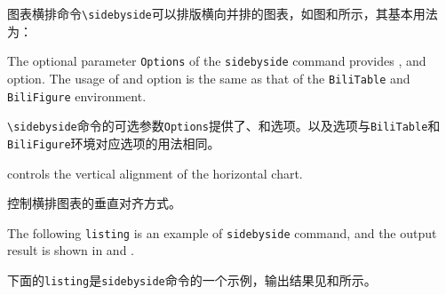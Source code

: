 \begin{ParaColumn}
    \switchcolumn

    图表横排命令\verb"\sidebyside"可以排版横向并排的图表，如图和所示，其基本用法为：

    \CrossColumnText{
        
        
    }
    \switchcolumn*

    The optional parameter \verb"Options" of the \verb"sidebyside" command provides ,  and  option.  The usage of  and  option is the same as that of the \verb"BiliTable" and \verb"BiliFigure" environment.

    \switchcolumn

    \verb"\sidebyside"命令的可选参数\verb"Options"提供了、和选项。以及选项与\verb"BiliTable"和\verb"BiliFigure"环境对应选项的用法相同。

    \switchcolumn*

     controls the vertical alignment of the horizontal chart.
    
    \switchcolumn

    控制横排图表的垂直对齐方式。

    \switchcolumn*

    The following \verb"listing" is an example of \verb"sidebyside" command, and the output result is shown in  and .

    \switchcolumn

    下面的\verb"listing"是\verb"sidebyside"命令的一个示例，输出结果见和所示。

    \CrossColumnText{
        
    }


\end{ParaColumn}
